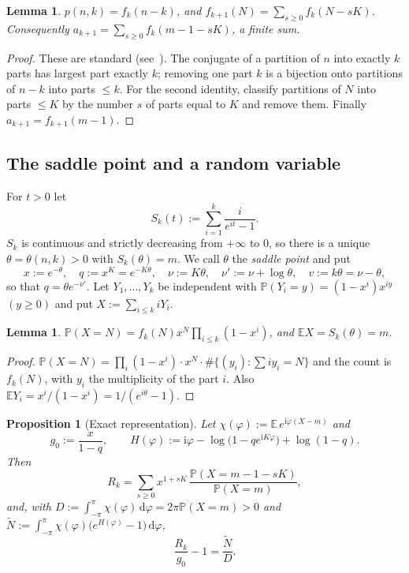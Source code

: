 \documentclass[11pt]{amsart}
\newtheorem{lemma}[theorem]{Lemma}
\newtheorem{proposition}[theorem]{Proposition}
\theoremstyle{definition}
\theoremstyle{remark}
\numberwithin{equation}{section}
\newcommand{\E}{\mathbb{E}}
\newcommand{\Prob}{\mathbb{P}}
\newcommand{\dd}{\,\mathrm{d}}
\newcommand{\ii}{\mathrm{i}}
\begin{document}
\begin{lemma}\label{lem:comb}
$p(n,k)=f_k(n-k)$, and $f_{k+1}(N)=\sum_{s\ge0}f_k(N-sK)$. Consequently
$a_{k+1}=\sum_{s\ge0}f_k(m-1-sK)$, a finite sum.
\end{lemma}

\begin{proof}
These are standard (see~\cite{Andrews}). The conjugate of a partition of $n$ into exactly $k$ parts has largest part exactly $k$; removing one part $k$ is a bijection
onto partitions of $n-k$ into parts $\le k$. For the second identity, classify partitions of $N$ into parts $\le K$ by the
number $s$ of parts equal to $K$ and remove them. Finally $a_{k+1}=f_{k+1}(m-1)$.
\end{proof}

\subsection{The saddle point and a random variable}
For $t>0$ let
\begin{equation}\label{eq:S}
  S_k(t):=\sum_{i=1}^{k}\frac{i}{e^{it}-1}.
\end{equation}
$S_k$ is continuous and strictly decreasing from $+\infty$ to $0$, so there is a unique $\theta=\theta(n,k)>0$ with
$S_k(\theta)=m$. We call $\theta$ the \emph{saddle point} and put
\begin{equation}\label{eq:params}
  x:=e^{-\theta},\quad q:=x^K=e^{-K\theta},\quad \nu:=K\theta,\quad \nu':=\nu+\log\theta,\quad v:=k\theta=\nu-\theta,
\end{equation}
so that $q=\theta e^{-\nu'}$. Let $Y_1,\dots,Y_k$ be independent with $\Prob(Y_i=y)=(1-x^i)x^{iy}$ $(y\ge0)$ and put
$X:=\sum_{i\le k}iY_i$.

\begin{lemma}\label{lem:X}
$\Prob(X=N)=f_k(N)x^N\prod_{i\le k}(1-x^i)$, and $\E X=S_k(\theta)=m$.
\end{lemma}

\begin{proof}
$\Prob(X=N)=\prod_i(1-x^i)\cdot x^N\cdot\#\{(y_i):\sum iy_i=N\}$ and the count is $f_k(N)$, with $y_i$ the multiplicity of the
part $i$. Also $\E Y_i=x^i/(1-x^i)=1/(e^{i\theta}-1)$.
\end{proof}

\begin{proposition}[Exact representation]\label{prop:rep}
Let $\chi(\varphi):=\E\,e^{\ii\varphi(X-m)}$ and
\[
  g_0:=\frac{x}{1-q},\qquad H(\varphi):=\ii\varphi-\log\bigl(1-qe^{\ii K\varphi}\bigr)+\log(1-q).
\]
Then
\begin{equation}\label{eq:rep1}
  R_k=\sum_{s\ge0}x^{1+sK}\,\frac{\Prob(X=m-1-sK)}{\Prob(X=m)},
\end{equation}
and, with $D:=\int_{-\pi}^{\pi}\chi(\varphi)\dd\varphi=2\pi\Prob(X=m)>0$ and $\tilde N:=\int_{-\pi}^{\pi}\chi(\varphi)\bigl(e^{H(\varphi)}-1\bigr)\dd\varphi$,
\begin{equation}\label{eq:rep2}
  \frac{R_k}{g_0}-1=\frac{\tilde N}{D}.
\end{equation}
\end{proposition}
\end{document}
